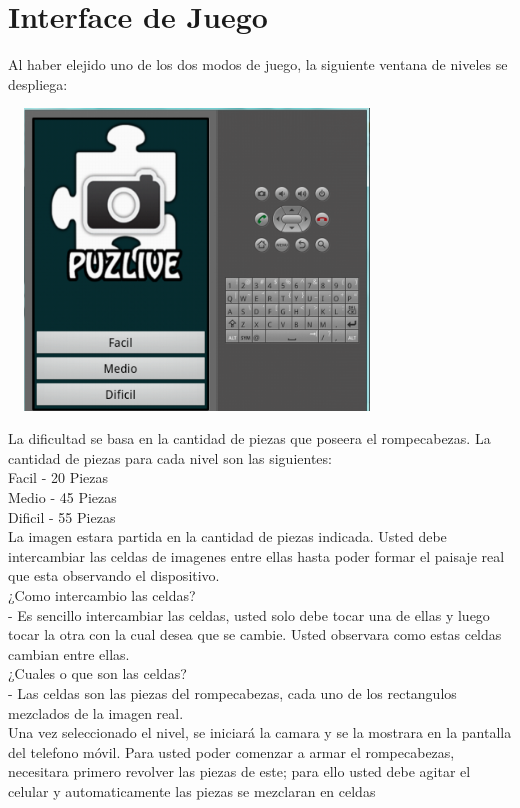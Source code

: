 \documentclass[10pt]{article}
\begin{document}
\section{Interface de Juego}
	Al haber elejido uno de los dos modos de juego, la siguiente ventana de niveles se despliega:
		\begin{center}
		\includegraphics[height=8cm,width=10cm]{niveles.png}
		\end{center}	
	La dificultad se basa en la cantidad de piezas que poseera el rompecabezas. La cantidad de piezas para cada nivel son las siguientes:
	\\ Facil   - 20 Piezas
	\\Medio - 45 Piezas
	\\Dificil  - 55 Piezas
	\\La imagen estara partida en la cantidad de piezas indicada. Usted debe intercambiar las celdas de imagenes entre ellas hasta poder formar el paisaje real que esta observando el dispositivo.
	\\ ¿Como intercambio las celdas?
	\\ - Es sencillo intercambiar las celdas, usted solo debe tocar una de ellas y luego tocar la otra con la cual desea que se cambie. Usted observara como estas celdas cambian entre ellas.
	\\ ¿Cuales o que son las celdas?
	\\ - Las celdas son las piezas del rompecabezas, cada uno de los rectangulos mezclados de la imagen real.
	\\Una vez seleccionado el nivel, se iniciar\'a la camara y se la mostrara en la pantalla del telefono m\'ovil.
	Para usted poder comenzar a armar el rompecabezas, necesitara primero revolver las piezas de este; para ello usted debe agitar el celular y automaticamente las piezas se mezclaran en celdas 
\end{document}
